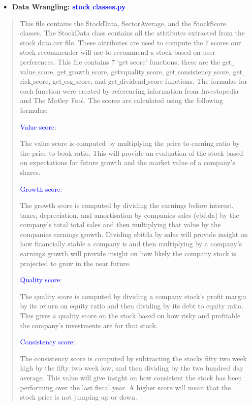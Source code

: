 \documentclass[fontsize=12pt]{article}
\begin{document}
\begin{itemize}
\item
  
  \textbf{Data Wrangling: \textcolor{blue}{stock$\_$classes.py}}
 
\end{itemize}
\begin{quote}
\noindent
This file contains the StockData, SectorAverage, and the StockScore classes. The StockData class contains all the attributes extracted from the stock$\_$data.csv file. These attributes are used to compute the 7 scores our stock recommender will use to recommend a stock based on user preferences. This file contains 7 ‘get score’ functions, these are the get$\_$value$\_$score, get$\_$growth$\_$score, getvquality$\_$score, get$\_$consistency$\_$score, get$\_$risk$\_$score, get$\_$esg$\_$score, and get$\_$dividend$\_$score functions. The formulas for each function were created by referencing information from Investopedia and The Motley Fool. The scores are calculated using the following formulas:

\textcolor{blue}{Value score}:

The value score is computed by multiplying the price to earning ratio by the price to book ratio. This will provide an evaluation of the stock based on expectations for future growth and the market value of a company’s shares.

\textcolor{blue}{Growth score}:

The growth score is computed by dividing the earnings before interest, taxes, depreciation, and amortisation by companies sales (ebitda) by the company’s total total sales and then multiplying that value by the companies earnings growth. Dividing ebitda by sales will provide insight on how financially stable a company is and then multiplying by a company's earnings growth will provide insight on how likely the company stock is projected to grow in the near future.

\textcolor{blue}{Quality score}:

The quality score is computed by dividing a company stock's profit margin by its return on equity ratio and then dividing by its debt to equity ratio. This gives a quality score on the stock based on how risky and profitable the company's investments are for that stock.

\textcolor{blue}{Consistency score}:

The consistency score is computed by subtracting the stocks fifty two week high by the fifty two week low, and then dividing by the two hundred day average. This value will give insight on how consistent the stock has been performing over the last fiscal year. A higher score will mean that the stock price is not jumping up or down. 


\end{quote}
\end{document}
